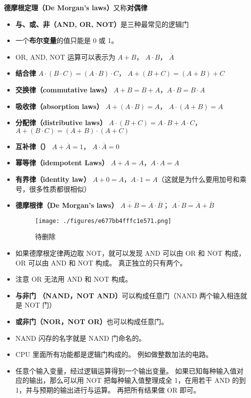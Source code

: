 
\begin{issues}
\issueDraft
\end{issues}

\textbf{德摩根定理（De Morgan's laws）}又称\textbf{对偶律}

\begin{itemize}
\item \textbf{与、或、非（AND, OR, NOT）}是三种最常见的逻辑门
\item 一个\textbf{布尔变量}的值只能是 0 或 1。
\item OR, AND, NOT 运算可以表示为 $A + B$， $A\cdot B$， $\overline A$

\item \textbf{结合律} $A\cdot(B\cdot C) = (A\cdot B)\cdot C$， $A+(B+C)=(A+B)+C$
\item \textbf{交换律（commutative laws）} $A+B=B+A$，$A\cdot B=B\cdot A$
\item \textbf{吸收律（absorption laws）} $A+(A\cdot B) = A$， $A\cdot(A+B) = A$
\item \textbf{分配律（distributive laws）} $A\cdot(B+C)=A\cdot B+A\cdot C$， $A+(B\cdot C) = (A+B)\cdot(A+C)$
\item \textbf{互补律（）} $A+\overline A = 1$， $A\cdot \overline A = 0$
\item \textbf{幂等律（idempotent Laws）} $A+A=A$，$A\cdot A=A$
\item \textbf{有界律（identity law）} $A+0=A$，$A\cdot 1=A$（这就是为什么要用加号和乘号，很多性质都很相似）
\item \textbf{德摩根律（De Morgan's laws）} $\overline{A+B} = \overline A \cdot \overline B$； $\overline{A \cdot B} = \overline A + \overline B$



\begin{figure}[ht]
\centering
\texttt{[image: ./figures/e677bb4fffc1e571.png]}
\caption{待删除} \label{fig_LogicG_1}
\end{figure}
\item 如果德摩根定律两边取 NOT，就可以发现 AND 可以由 OR 和 NOT 构成， OR 可以由 AND 和 NOT 构成。 真正独立的只有两个。
\item 注意 OR 无法用 AND 和 NOT 构成。
\item \textbf{与非门 （NAND，NOT AND）}可以构成任意门（NAND 两个输入相连就是 NOT 门）
\item \textbf{或非门（NOR，NOT OR）}也可以构成任意门。 
\item NAND 闪存的名字就是 NAND 门命名的。
\item CPU 里面所有功能都是逻辑门构成的。 例如做整数加法的电路。
\item 任意个输入变量，经过逻辑运算得到一个输出变量。 如果已知每种输入值对应的输出，那么可以用 NOT 把每种输入值整理成全 1，在用若干 AND 的到 1，并与预期的输出进行与运算。 再把所有结果做 OR 即可。
\end{itemize}
